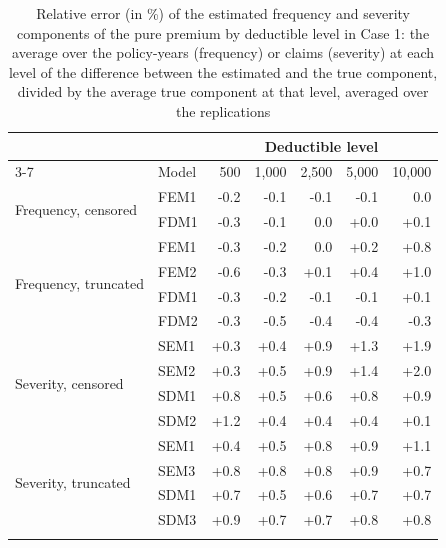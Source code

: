 \begin{table}[!ht]
\footnotesize
\centering
{\color{blue}
\begin{tabular}{llrrrrr}
\toprule
 & & \multicolumn{5}{c}{Deductible level} \\
\cmidrule(lr){3-7}
 & Model &    500 &  1,000 &  2,500 &  5,000 & 10,000 \\
\midrule
\multirow{2}{*}{Frequency, censored} & FEM1 & -0.2 & -0.1 & -0.1 & -0.1 & 0.0 \\
 & FDM1 & -0.3 & -0.1 & 0.0 & +0.0 & +0.1 \\
\midrule
\multirow{4}{*}{Frequency, truncated} & FEM1 & -0.3 & -0.2 & 0.0 & +0.2 & +0.8 \\
 & FEM2 & -0.6 & -0.3 & +0.1 & +0.4 & +1.0 \\
 & FDM1 & -0.3 & -0.2 & -0.1 & -0.1 & +0.1 \\
 & FDM2 & -0.3 & -0.5 & -0.4 & -0.4 & -0.3 \\
\midrule
\multirow{4}{*}{Severity, censored} & SEM1 & +0.3 & +0.4 & +0.9 & +1.3 & +1.9 \\
 & SEM2 & +0.3 & +0.5 & +0.9 & +1.4 & +2.0 \\
 & SDM1 & +0.8 & +0.5 & +0.6 & +0.8 & +0.9 \\
 & SDM2 & +1.2 & +0.4 & +0.4 & +0.4 & +0.1 \\
\midrule
\multirow{4}{*}{Severity, truncated} & SEM1 & +0.4 & +0.5 & +0.8 & +0.9 & +1.1 \\
 & SEM3 & +0.8 & +0.8 & +0.8 & +0.9 & +0.7 \\
 & SDM1 & +0.7 & +0.5 & +0.6 & +0.7 & +0.7 \\
 & SDM3 & +0.9 & +0.7 & +0.7 & +0.8 & +0.8 \\
\hhline{=======}
\end{tabular}
}
\caption{Relative error (in \%) of the estimated frequency and severity components of the pure premium by deductible level in Case 1: the average over the policy-years (frequency) or claims (severity) at each level of the difference between the estimated and the true component, divided by the average true component at that level, averaged over the replications}\label{tab:bylevel1}
\end{table}
